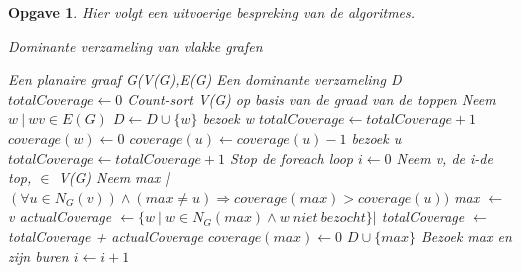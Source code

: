\documentclass[11pt, a4paper]{article}
\newtheorem{opgave}{Opgave}
\begin{document}
\begin{opgave}
	
		Hier volgt een uitvoerige bespreking van de algoritmes. 
		\begin{tcolorbox}[blanker,float=tbp, grow to left by=1cm,grow to right by=1cm]
		\begin{algorithm}[H]
			\caption{Dominante verzameling van vlakke grafen}
			\begin{algorithmic}[1]
				\Require Een planaire graaf G(V(G),E(G)
				\Ensure Een dominante verzameling D
				\State $totalCoverage \gets 0$
				\State Count-sort V(G) op basis van de graad van de toppen\label{sortoperation}
				\label{startoptimalizationloop1}
					\State Neem $w\ |\ wv \in E(G)$
						\State $D \gets D \cup \{w\}$
						\State bezoek w 
						\State $totalCoverage \gets totalCoverage+1$
						\State $coverage(w) \gets 0$
					\EndIf 
						\State $coverage(u) \gets coverage(u) - 1$
							\State bezoek u
							\State $totalCoverage \gets totalCoverage + 1 $
						\EndIf
					\EndFor
						\State Stop de foreach loop
					\EndIf 
				\EndFor\label{endoptimalizationloop1}
				 \label{startoptimalizationloop2}
					\State $i \gets 0$
					\label{startactualalgorithmloop}
						\State Neem v, de i-de top, $\in$ V(G)
							\State Neem max | $(\forall u \in N_G(v)) \land (max \ne u) \Rightarrow coverage(max)>coverage(u))$\label{neighbourloop1}
								\State max $\gets$ v
							\EndIf
								\State actualCoverage $\gets \{w\ |\ w \in N_G(max) \land w\ niet \  bezocht\}|$\label{neighbourloop2}
									\State totalCoverage $\gets$ totalCoverage + actualCoverage
									\State $coverage(max)  \gets 0$
									\State $ D \cup \{max\}$
									\State Bezoek max en zijn buren\label{neighbourloop3}
								\EndIf 
							\EndIf
						\EndIf
						\State $i \gets i+1$
					\EndWhile\label{endactualalgorithmloop}
				\EndFor\label{endoptimalizationloop2}
				
			\end{algorithmic}
		\end{algorithm}
		\end{tcolorbox}


\end{opgave}
\end{document}
